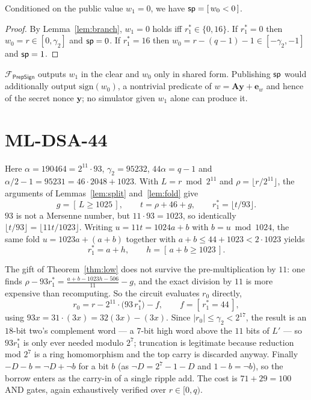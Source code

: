 \begin{lemma}
Conditioned on the public value $w_1=0$, we have $\mathsf{sp}=[\,w_0<0\,]$.
\end{lemma}

\begin{proof}
By Lemma~\ref{lem:branch}, $w_1=0$ holds iff $r_1^{*}\in\{0,16\}$. If
$r_1^{*}=0$ then $w_0=r\in[0,\gamma_2]$ and $\mathsf{sp}=0$. If $r_1^{*}=16$ then
$w_0=r-(q-1)-1\in[-\gamma_2,-1]$ and $\mathsf{sp}=1$.
\end{proof}

$\mathcal{F}_{\mathsf{PrepSign}}$ outputs $w_1$ in the clear and $w_0$ only in
shared form. Publishing $\mathsf{sp}$ would additionally output
$\mathrm{sign}(w_0)$, a nontrivial predicate of $w=\mathbf{A}\mathbf{y}+
\mathbf{e}_w$ and hence of the secret nonce $\mathbf{y}$; no simulator given
$w_1$ alone can produce it.

\section{ML-DSA-44}

Here $\alpha=190464=2^{11}\cdot93$, $\gamma_2=95232$, $44\alpha=q-1$ and
$\alpha/2-1=95231=46\cdot2048+1023$. With $L=r\bmod 2^{11}$ and
$\rho=\lfloor r/2^{11}\rfloor$, the arguments of Lemmas~\ref{lem:split}
and~\ref{lem:fold} give
\[
  g=[\,L\ge1025\,],\qquad t=\rho+46+g,\qquad r_1^{*}=\lfloor t/93\rfloor .
\]
$93$ is not a Mersenne number, but $11\cdot93=1023$, so identically
$\lfloor t/93\rfloor=\lfloor 11t/1023\rfloor$. Writing $u=11t=1024a+b$ with
$b=u\bmod1024$, the same fold $u=1023a+(a+b)$ together with
$a+b\le44+1023<2\cdot1023$ yields
\[
  r_1^{*}=a+h,\qquad h=[\,a+b\ge1023\,].
\]

The gift of Theorem~\ref{thm:low} does not survive the pre-multiplication by
$11$: one finds $\rho-93r_1^{*}=\frac{a+b-1023h-506}{11}-g$, and the exact
division by $11$ is more expensive than recomputing. So the circuit evaluates
$r_0$ directly,
\[
  r_0=r-2^{11}\cdot\big(93\,r_1^{*}\big)-f,\qquad f=[\,r_1^{*}=44\,],
\]
using $93x=31\cdot(3x)=32(3x)-(3x)$. Since $|r_0|\le\gamma_2<2^{17}$, the result
is an $18$-bit two's complement word --- a $7$-bit high word above the $11$ bits
of $L'$ --- so $93r_1^{*}$ is only ever needed modulo $2^{7}$; truncation is
legitimate because reduction mod $2^{7}$ is a ring homomorphism and the top
carry is discarded anyway. Finally $-D-b=\neg D+\neg b$ for a bit $b$ (as
$\neg D=2^{7}-1-D$ and $1-b=\neg b$), so the borrow enters as the carry-in of a
single ripple add. The cost is $71+29=100$ AND gates, again exhaustively
verified over $r\in[0,q)$.



